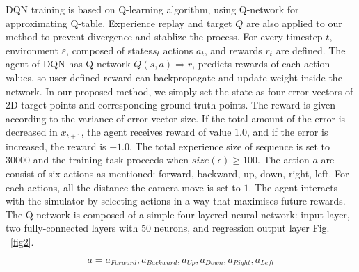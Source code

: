 \documentclass[10pt]{article}
\begin{document}
DQN training is based on Q-learning\cite{ref1} algorithm, using Q-network for approximating Q-table. Experience replay and target $Q$ are also applied to our method to prevent divergence and  stablize the process. For every timestep $t$, environment $\varepsilon$, composed of states$s_t$ actions $a_t$, and rewards $r_t$ are defined. The agent of DQN has Q-network $Q(s, a) \Rightarrow r$, predicts rewards of each action values, so user-defined reward can backpropagate and update weight inside the network\cite{ref2}. In our proposed method, we simply set the state as four error vectors of 2D target points and corresponding ground-truth points. The reward is given according to the variance of error vector size. If the total amount of the error is decreased in $x_{t+1}$, the agent receives reward of value $1.0$, and if the error is increased, the reward is $-1.0$. The total experience size of sequence is set to $30000$ and the training task proceeds when $size(\epsilon) \geq 100$. The action $a$ are consist of six actions as mentioned: forward, backward, up, down, right, left. For each actions, all the distance the camera move is set to $1$. The agent interacts with the simulator by selecting actions in a way that maximises future rewards. The Q-network is composed of a simple four-layered neural network: input layer, two fully-connected layers with 50 neurons, and regression output layer Fig. ~\ref{fig2}.

\begin{equation}\label{actions}
  a = {a_{Forward}, a_{Backward}, a_{Up}, a_{Down}, a_{Right}, a_{Left}}
\end{equation}
\end{document}
